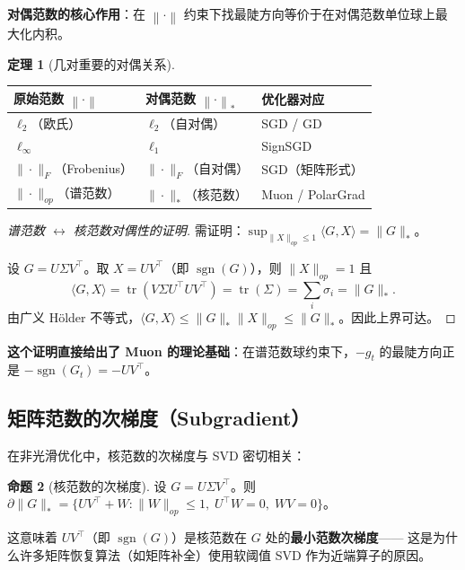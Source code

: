 \documentclass[12pt,a4paper]{ctexart}
\theoremstyle{definition}
\newtheorem{theorem}{定理}[section]
\newtheorem{proposition}[theorem]{命题}
\theoremstyle{plain}
\newcommand{\tr}{\operatorname{tr}}
\newcommand{\norm}[1]{\left\lVert #1 \right\rVert}
\DeclareMathOperator{\sgn}{sgn}
\begin{document}
\textbf{对偶范数的核心作用}：在 $\norm{\cdot}$ 约束下找最陡方向等价于在对偶范数单位球上最大化内积。

\begin{theorem}[几对重要的对偶关系]
  \begin{center}
  \begin{tabular}{lll}
  \toprule
  原始范数 $\norm{\cdot}$ & 对偶范数 $\norm{\cdot}_*$ & 优化器对应 \\
  \midrule
  $\ell_2$（欧氏） & $\ell_2$（自对偶） & SGD / GD \\
  $\ell_\infty$ & $\ell_1$ & SignSGD \\
  $\|\cdot\|_F$（Frobenius） & $\|\cdot\|_F$（自对偶） & SGD（矩阵形式） \\
  $\|\cdot\|_{op}$（谱范数） & $\|\cdot\|_*$（核范数） & Muon / PolarGrad \\
  \bottomrule
  \end{tabular}
  \end{center}
\end{theorem}

\begin{proof}[谱范数 $\leftrightarrow$ 核范数对偶性的证明]
  需证明：$\sup_{\|X\|_{op}\le1}\langle G,X\rangle = \|G\|_*$。

  设 $G=U\Sigma V^\top$。取 $X=UV^\top$（即 $\sgn(G)$），则 $\|X\|_{op}=1$ 且
  \[
    \langle G, X\rangle = \tr(V\Sigma U^\top U V^\top) = \tr(\Sigma) = \sum_i\sigma_i = \|G\|_*.
  \]
  由广义 Hölder 不等式，$\langle G,X\rangle\le\|G\|_*\|X\|_{op}\le\|G\|_*$。因此上界可达。
\end{proof}

\textbf{这个证明直接给出了 Muon 的理论基础}：在谱范数球约束下，$-g_t$ 的最陡方向正是 $-\sgn(G_t) = -UV^\top$。

\subsection{矩阵范数的次梯度（Subgradient）}

在非光滑优化中，核范数的次梯度与 SVD 密切相关：

\begin{proposition}[核范数的次梯度]
  设 $G=U\Sigma V^\top$。则 $\partial\|G\|_* = \{UV^\top + W: \|W\|_{op}\le1,\;U^\top W=0,\;WV=0\}$。
\end{proposition}

这意味着 $UV^\top$（即 $\sgn(G)$）是核范数在 $G$ 处的\textbf{最小范数次梯度}——
这是为什么许多矩阵恢复算法（如矩阵补全）使用软阈值 SVD 作为近端算子的原因。
\end{document}
